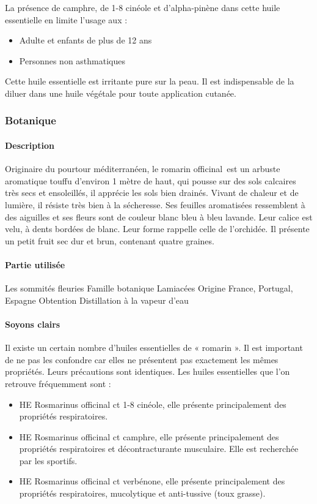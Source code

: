 \documentclass[12pt,a4wide]{article}
\begin{document}
La présence de camphre, de 1-8 cinéole et d'alpha-pinène dans cette huile essentielle en limite l'usage aux :
\begin{itemize}
\item Adulte et enfants de plus de 12 ans
\item Personnes non asthmatiques
\end{itemize}
Cette huile essentielle est irritante pure sur la peau. Il est indispensable de la diluer dans une huile végétale pour toute application cutanée.


\subsubsection{Botanique}
\label{sec-4-9-2}

\paragraph{Description}
\label{sec-4-9-2-1}

Originaire du pourtour méditerranéen, le romarin officinal est un arbuste aromatique touffu d'environ 1 mètre de haut, qui pousse sur des sols calcaires très secs et ensoleillés, il apprécie les sols bien drainés. Vivant de chaleur et de lumière, il résiste très bien à la sécheresse. Ses feuilles aromatisées ressemblent à des aiguilles et ses fleurs sont de couleur blanc bleu à bleu lavande. Leur calice est velu, à dents bordées de blanc. Leur forme rappelle celle de l'orchidée. Il présente un petit fruit sec dur et brun, contenant quatre graines.

\paragraph{Partie utilisée}
\label{sec-4-9-2-2}
Les sommités fleuries
Famille botanique
Lamiacées
Origine
France, Portugal, Espagne
Obtention
Distillation à la vapeur d'eau

\paragraph{Soyons clairs}
\label{sec-4-9-2-3}

Il existe un certain nombre d'huiles essentielles de « romarin ». Il est important de ne pas les confondre car elles ne présentent pas exactement les mêmes propriétés.
Leurs précautions sont identiques.
Les huiles essentielles que l'on retrouve fréquemment sont :
\begin{itemize}
\item HE Rosmarinus officinal ct 1-8 cinéole, elle présente principalement des propriétés respiratoires.
\item HE Rosmarinus officinal ct camphre, elle présente principalement des propriétés respiratoires et décontracturante musculaire. Elle est recherchée par les sportifs.
\item HE Rosmarinus officinal ct verbénone, elle présente principalement des propriétés respiratoires, mucolytique et anti-tussive (toux grasse).
\end{itemize}
\end{document}
